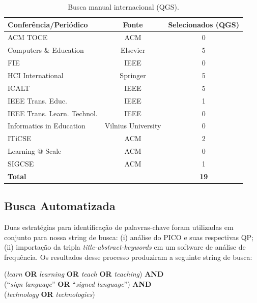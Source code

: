 \begin{table}[htbp]
\centering
\caption{Busca manual internacional (QGS).}
\label{ms:table:busca-manual-internacional}
\begin{tabular}{lcc}
\hline
\textbf{Conferência/Periódico} & \textbf{Fonte}     & \textbf{Selecionados (QGS)} \\ \hline
ACM TOCE                       & ACM                & 0            \\ 
Computers \& Education         & Elsevier           & 5            \\ 
FIE                            & IEEE               & 0            \\ 
HCI International              & Springer           & 5            \\ 
ICALT                          & IEEE               & 5            \\ 
IEEE Trans. Educ.              & IEEE               & 1            \\ 
IEEE Trans. Learn. Technol.    & IEEE               & 0            \\ 
Informatics in Education       & Vilnius University & 0            \\ 
ITiCSE                         & ACM                & 2            \\ 
Learning @ Scale               & ACM                & 0            \\ 
SIGCSE                         & ACM                & 1            \\ 
\textbf{Total}                 & \textbf{}          & \textbf{19}  \\ \hline
\end{tabular}
\end{table}


\subsection{Busca Automatizada}
\label{ms:conducao-busca-automatizada}

Duas estratégias para identificação de palavras-chave foram utilizadas em conjunto para nossa string de busca: (i) análise do PICO e suas respectivas QP; (ii) importação da tripla \textit{title-abstract-keywords} em um software de análise de frequência. Os resultados desse processo produziram a seguinte string de busca:

\begin{center}
    (\textit{learn} \textbf{OR} \textit{learning} \textbf{OR} \textit{teach} \textbf{OR} \textit{teaching}) \textbf{AND}\\
    (``\textit{sign language}'' \textbf{OR} ``\textit{signed language}'') \textbf{AND}\\
    (\textit{technology} \textbf{OR} \textit{technologies})\\
\end{center}

